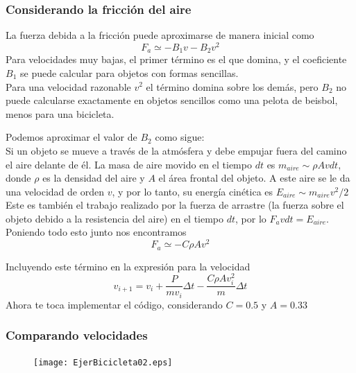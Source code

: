 \begin{frame}
\frametitle{Considerando la fricci\'{o}n del aire}
La fuerza debida a la fricci\'{o}n puede aproximarse de manera inicial como
\begin{equation}\label{EqFfriccion}
F_{a} \simeq - B_{1} v - B_{2} v^{2}
\end{equation}
Para velocidades muy bajas, el primer t\'{e}rmino es el que domina, y el coeficiente $B_{1}$ se puede calcular para objetos con formas sencillas.
\\
\medskip
Para una velocidad razonable $v^{2}$ el t\'{e}rmino domina sobre los dem\'{a}s, pero $B_{2}$ no puede calcularse exactamente en objetos sencillos como una pelota de beisbol, menos para una bicicleta.
\end{frame}
\begin{frame}
Podemos aproximar el valor de $B_{2}$ como sigue:
\\
\medskip
Si un objeto se mueve a trav\'{e}s de la atm\'{o}sfera y debe empujar fuera del camino el aire delante de \'{e}l. La masa de aire movido en el tiempo $dt$ es $m_{aire} \sim \rho Avdt$, donde $\rho$ es la densidad del aire y $A$ el \'{a}rea frontal del objeto. A este aire se le da una velocidad de orden $v$, y por lo tanto, su energ\'{i}a cin\'{e}tica es $E_{aire} \sim m_{aire} v^{2} /2$
\\
\medskip
Este es tambi\'{e}n el trabajo realizado por la fuerza de arrastre (la fuerza sobre el objeto debido a la resistencia del aire) en el tiempo $dt$, por lo $F_{a}vdt = E_{aire}$. Poniendo todo esto junto nos encontramos
\[ F_{a} \simeq - C \rho A v^{2} \]
\end{frame}
\begin{frame}
Incluyendo este t\'{e}rmino en la expresi\'{o}n para la velocidad
\begin{equation}\label{Eqvelifriccion}
v_{i+1} = v_{i} + \dfrac{P}{m v_{i}} \Delta t - \dfrac{C \rho A v_{i}^{2}}{m} \Delta t
\end{equation}
Ahora te toca implementar el c\'{o}digo, considerando $C = 0.5$ y $A=0.33$
\end{frame}
\begin{frame}
\frametitle{Comparando velocidades}
\begin{figure}
	\centering
	\texttt{[image: EjerBicicleta02.eps]}
\end{figure}
\end{frame}

